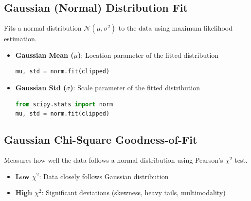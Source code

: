 \documentclass[12pt]{article}
\begin{document}
\subsection{Gaussian (Normal) Distribution Fit}
Fits a normal distribution $\mathcal{N}(\mu, \sigma^2)$ to the data using maximum likelihood estimation.

\begin{itemize}
    \item \textbf{Gaussian Mean ($\mu$)}: Location parameter of the fitted distribution
    \begin{lstlisting}[language=Python]
mu, std = norm.fit(clipped)
    \end{lstlisting}

    \item \textbf{Gaussian Std ($\sigma$)}: Scale parameter of the fitted distribution
    \begin{lstlisting}[language=Python]
from scipy.stats import norm
mu, std = norm.fit(clipped)
    \end{lstlisting}
\end{itemize}

\subsection{Gaussian Chi-Square Goodness-of-Fit}
Measures how well the data follows a normal distribution using Pearson's $\chi^2$ test.

\begin{itemize}
    \item \textbf{Low $\chi^2$}: Data closely follows Gaussian distribution
    \item \textbf{High $\chi^2$}: Significant deviations (skewness, heavy tails, multimodality)
\end{itemize}
\end{document}
